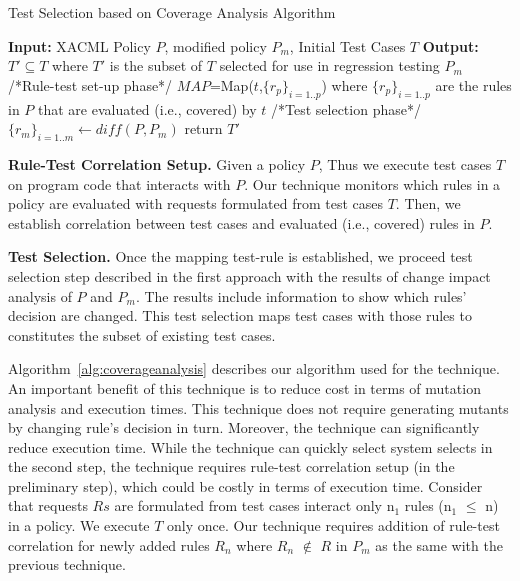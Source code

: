 \begin{algorithmic}
\begin{algorithm}[t]
\caption{\label{alg:coverageanalysis}Test Selection based on Coverage Analysis Algorithm}
\STATE \textbf{Input:} XACML Policy $P$, modified policy $P_{m}$, Initial Test Cases $T$
\STATE \textbf{Output:} $T' \subseteq T$ where $T'$ is the subset of $T$ selected for use in regression testing $P_{m}$
\STATE /*Rule-test set-up phase*/
\STATE $MAP$=Map($t$,$\{r_{p}\}_{i=1..p}$) where $\{r_{p}\}_{i=1..p}$ are the rules in $P$ that are evaluated (i.e., covered) by $t$
\ENDFOR
\STATE /*Test selection phase*/
\STATE $\{r_{m}\}_{i=1..m} \leftarrow diff(P,P_{m})$
\ENDFOR
\STATE return $T'$
\end{algorithm}
\end{algorithmic}

\textbf{Rule-Test Correlation Setup.} Given a policy $P$,
Thus we execute test cases $T$ on program code that interacts with $P$. Our technique monitors which rules in a policy are evaluated with
requests formulated from test cases $T$. Then, we establish correlation between test cases and evaluated (i.e., covered) rules in $P$. 

\textbf{Test Selection.}
Once the mapping test-rule is established, we proceed test selection step described in the first approach with
the results of change impact analysis of $P$ and $P_m$. The results include information to show which rules' decision are changed.
This test selection maps test cases with those rules to constitutes the subset of existing test cases.

Algorithm~\ref{alg:coverageanalysis} describes our algorithm used for the technique.
An important benefit of this technique is to reduce cost in terms of mutation analysis and execution times. This technique does not 
require generating mutants by changing rule's decision in turn. Moreover, the technique can significantly reduce execution time.
While the technique can quickly select system selects in the second step, the technique requires rule-test correlation setup (in the preliminary step), 
which could be costly in terms of execution time. Consider that requests $Rs$ are formulated from test cases interact 
only n$_1$ rules (n$_1$ $\leq$ n) in a policy.
We execute $T$ only once. Our technique requires addition of rule-test
correlation for newly added rules $R_n$ where $R_n$ $\notin$ $R$ in $P_m$ as the same with the previous technique.


